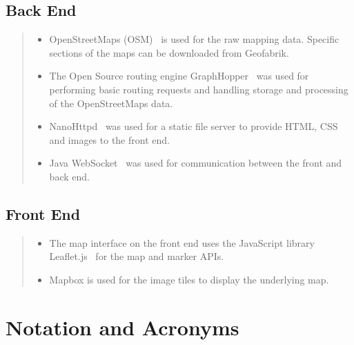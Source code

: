 \documentclass[ %
                    author={Alexander Hill},
                supervisor={Dr. Benjamin Sach},
                    degree={MEng},
                     title={MARMOSET},
                  subtitle={Multi-Agent Route Management using Online Simulation for Efficient Transportation},
                      type={research},
                      year={2016} ]{dissertation}
\begin{document}
\section*{Back End}
\begin{quote}
\noindent
\begin{itemize}
    \item OpenStreetMaps (OSM)~\cite{osm} is used for the raw mapping data. Specific sections of
        the maps can be downloaded from Geofabrik.
    \item The Open Source routing engine GraphHopper~\cite{graphhopper} was
        used for performing basic routing requests and handling storage and
        processing of the OpenStreetMaps data.
    \item NanoHttpd~\cite{nanohttpd} was used for a static file server to
        provide HTML, CSS and images to the front end.
    \item Java WebSocket~\cite{javawebsocket} was used for communication
        between the front and back end.
\end{itemize}
\end{quote}

\section*{Front End}
\begin{quote}
\noindent
\begin{itemize}
    \item The map interface on the front end uses the JavaScript library
        Leaflet.js~\cite{leaflet} for the map and marker APIs.
    \item Mapbox is used for the image tiles to display the underlying map.
\end{itemize}
\end{quote}



\chapter*{Notation and Acronyms}


\end{document}
